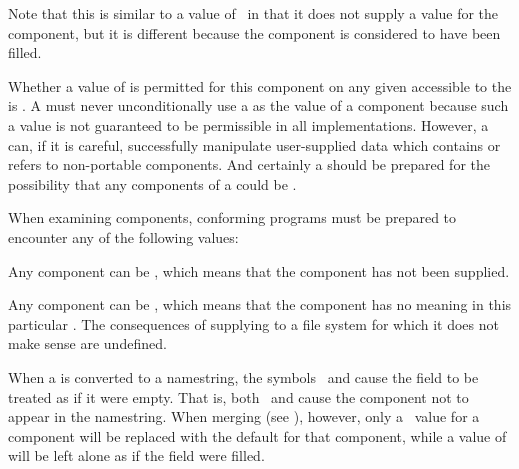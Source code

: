 Note that this is similar to a value of \nil\ in that it
does not supply a value for the component, but it is different
because the component is considered to have been filled.

Whether a value of  is permitted for this component
on any given  accessible to the 
is .
A  must never unconditionally use a
 as the value of a  component because
such a value is not guaranteed to be permissible in all implementations.
However, a  can, if it is careful, 
successfully manipulate user-supplied data 
which contains or refers to non-portable  components.
And certainly a  should be prepared for the
possibility that any components of a  could be .

\endsubsubsubsection%

\endsubsubsection%



When examining  components, conforming programs must be prepared
to encounter any of the following values:
  
\beginlist
\itemitem{\bull}
Any component can be \nil, which means that the component has not
    been supplied.
  
\itemitem{\bull}          
Any component can be , which means that the component has
    no meaning in this particular .
   The consequences of supplying  to a file system for which
  it does not make sense are undefined.
 
  When a  is converted to a namestring, 
the symbols \nil\ and 
  cause the field to be treated as if it were empty. 
That is, both \nil\ and  cause the
  component not to appear in the namestring.
   When merging (see ), 
however, only a \nil\ value for a component will be
  replaced with the default for that component, while 
a value of 
  will be left alone as if the field were filled.
 
  
